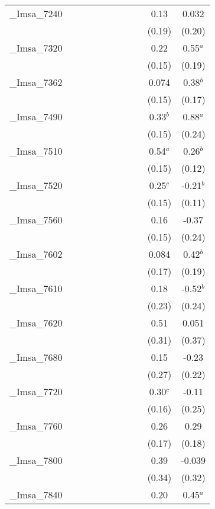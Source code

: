 \documentclass[]{article}
\begin{document}
\begin{tabular}{lcccccccccc}
\_Imsa\_7240 &  &  &  &  &  &  &  &  & 0.13 & 0.032 \\
 &  &  &  &  &  &  &  &  & (0.19) & (0.20) \\
\_Imsa\_7320 &  &  &  &  &  &  &  &  & 0.22 & 0.55$^a$ \\
 &  &  &  &  &  &  &  &  & (0.15) & (0.19) \\
\_Imsa\_7362 &  &  &  &  &  &  &  &  & 0.074 & 0.38$^b$ \\
 &  &  &  &  &  &  &  &  & (0.15) & (0.17) \\
\_Imsa\_7490 &  &  &  &  &  &  &  &  & 0.33$^b$ & 0.88$^a$ \\
 &  &  &  &  &  &  &  &  & (0.15) & (0.24) \\
\_Imsa\_7510 &  &  &  &  &  &  &  &  & 0.54$^a$ & 0.26$^b$ \\
 &  &  &  &  &  &  &  &  & (0.15) & (0.12) \\
\_Imsa\_7520 &  &  &  &  &  &  &  &  & 0.25$^c$ & -0.21$^b$ \\
 &  &  &  &  &  &  &  &  & (0.15) & (0.11) \\
\_Imsa\_7560 &  &  &  &  &  &  &  &  & 0.16 & -0.37 \\
 &  &  &  &  &  &  &  &  & (0.15) & (0.24) \\
\_Imsa\_7602 &  &  &  &  &  &  &  &  & 0.084 & 0.42$^b$ \\
 &  &  &  &  &  &  &  &  & (0.17) & (0.19) \\
\_Imsa\_7610 &  &  &  &  &  &  &  &  & 0.18 & -0.52$^b$ \\
 &  &  &  &  &  &  &  &  & (0.23) & (0.24) \\
\_Imsa\_7620 &  &  &  &  &  &  &  &  & 0.51 & 0.051 \\
 &  &  &  &  &  &  &  &  & (0.31) & (0.37) \\
\_Imsa\_7680 &  &  &  &  &  &  &  &  & 0.15 & -0.23 \\
 &  &  &  &  &  &  &  &  & (0.27) & (0.22) \\
\_Imsa\_7720 &  &  &  &  &  &  &  &  & 0.30$^c$ & -0.11 \\
 &  &  &  &  &  &  &  &  & (0.16) & (0.25) \\
\_Imsa\_7760 &  &  &  &  &  &  &  &  & 0.26 & 0.29 \\
 &  &  &  &  &  &  &  &  & (0.17) & (0.18) \\
\_Imsa\_7800 &  &  &  &  &  &  &  &  & 0.39 & -0.039 \\
 &  &  &  &  &  &  &  &  & (0.34) & (0.32) \\
\_Imsa\_7840 &  &  &  &  &  &  &  &  & 0.20 & 0.45$^a$ \\

\end{tabular}
\end{document}
